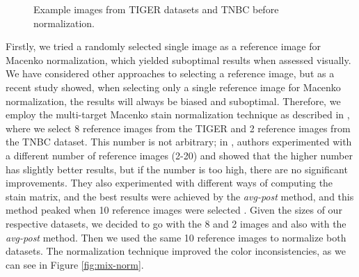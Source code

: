 \begin{figure}[H]
  \caption{Example images from TIGER datasets \cite{tiger_dataset} and TNBC \cite{TNBC-nuclei-seg-extended} before normalization.}
  \label{fig:mix-no-norm}
\end{figure}

Firstly, we tried a randomly selected single image as a reference image for Macenko normalization, which yielded suboptimal results when assessed visually. We have considered other approaches to selecting a reference image, but as a recent study \cite{Ivanov2024} showed, when selecting only a single reference image for Macenko normalization, the results will always be biased and suboptimal. Therefore, we employ the multi-target Macenko stain normalization technique as described in \cite{Ivanov2024}, where we select 8 reference images from the TIGER and 2 reference images from the TNBC dataset. This number is not arbitrary; in \cite{Ivanov2024}, authors experimented with a different number of reference images (2-20) and showed that the higher number has slightly better results, but if the number is too high, there are no significant improvements. They also experimented with different ways of computing the stain matrix, and the best results were achieved by the \textit{avg-post} method, and this method peaked when 10 reference images were selected \cite{Ivanov2024}. Given the sizes of our respective datasets, we decided to go with the 8 and 2 images and also with the \textit{avg-post} method. Then we used the same 10 reference images to normalize both datasets. The normalization technique improved the color inconsistencies, as we can see in Figure \ref{fig:mix-norm}.

